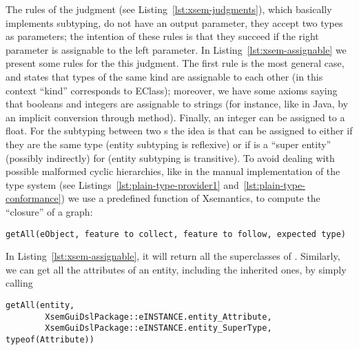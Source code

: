 The rules of the judgment  (see
Listing~\ref{lst:xsem-judgments}), which basically implements subtyping, do not
have an output parameter, they accept two types as parameters; the intention of
these rules is that they succeed if the right parameter is assignable to the
left parameter.
In Listing~\ref{lst:xsem-assignable} we present some rules for the this
judgment.  The first rule is the most general case, and states that types of the
same kind are assignable to each other (in this context ``kind'' corresponds to
EClass); moreover, we have some axioms saying that booleans and integers are
assignable to strings (for instance, like in Java, by an implicit conversion
through  method).  Finally, an integer can be assigned to a
float.
For the subtyping between two s the idea is that 
can be assigned to  either if they are the same type (entity
subtyping is reflexive) or if  is a ``super entity'' (possibly
indirectly) for  (entity subtyping is transitive).
To avoid dealing with possible malformed cyclic hierarchies, like in the manual
implementation of the type system (see Listings~\ref{lst:plain-type-provider1}
and~\ref{lst:plain-type-conformance}) we use a predefined function of
Xsemantics, to compute the ``closure'' of a graph:

\begin{lstlisting}[language=xsemantics] 
getAll(eObject, feature to collect, feature to follow, expected type)
\end{lstlisting}

In Listing~\ref{lst:xsem-assignable}, it will return all
the superclasses of .  Similarly, we can get all the attributes of
an entity, including the inherited ones, by simply calling

\begin{lstlisting}[language=xsemantics] 
getAll(entity, 
		XsemGuiDslPackage::eINSTANCE.entity_Attribute,
		XsemGuiDslPackage::eINSTANCE.entity_SuperType, typeof(Attribute))
\end{lstlisting}

% 

